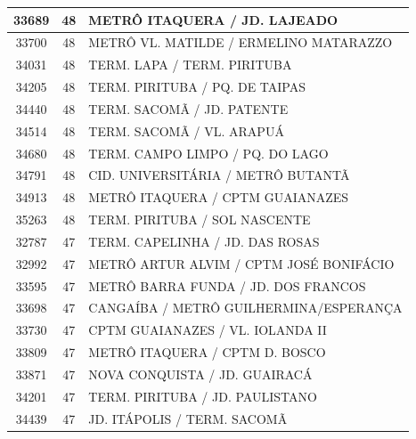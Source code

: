 \documentclass[
	12pt,				%
	oneside,			%
	a4paper,			%
	english,			%
	brazil				%
	]{abntex2ppgsi}
\begin{document}
\begin{apendicesenv}
\begin{longtable}{c|c|p{7cm}}
    33689 & 48    & METRÔ ITAQUERA / JD. LAJEADO \\
\hline

    33700 & 48    & METRÔ VL. MATILDE / ERMELINO MATARAZZO \\
\hline

    34031 & 48    & TERM. LAPA / TERM. PIRITUBA \\
\hline

    34205 & 48    & TERM. PIRITUBA / PQ. DE TAIPAS \\
\hline

    34440 & 48    & TERM. SACOMÃ / JD. PATENTE \\
\hline

    34514 & 48    & TERM. SACOMÃ / VL. ARAPUÁ \\
\hline

    34680 & 48    & TERM. CAMPO LIMPO / PQ. DO LAGO \\
\hline

    34791 & 48    & CID. UNIVERSITÁRIA / METRÔ BUTANTÃ \\
\hline

    34913 & 48    & METRÔ ITAQUERA / CPTM GUAIANAZES \\
\hline

    35263 & 48    & TERM. PIRITUBA / SOL NASCENTE \\
\hline

    32787 & 47    & TERM. CAPELINHA / JD. DAS ROSAS \\
\hline

    32992 & 47    & METRÔ ARTUR ALVIM / CPTM JOSÉ BONIFÁCIO \\
\hline

    33595 & 47    & METRÔ BARRA FUNDA / JD. DOS FRANCOS \\
\hline

    33698 & 47    & CANGAÍBA / METRÔ GUILHERMINA/ESPERANÇA \\
\hline

    33730 & 47    & CPTM GUAIANAZES / VL. IOLANDA II \\
\hline

    33809 & 47    & METRÔ ITAQUERA / CPTM D. BOSCO \\
\hline

    33871 & 47    & NOVA CONQUISTA / JD. GUAIRACÁ \\
\hline

    34201 & 47    & TERM. PIRITUBA / JD. PAULISTANO \\
\hline

    34439 & 47    & JD. ITÁPOLIS / TERM. SACOMÃ \\
\hline


\end{longtable}
\end{apendicesenv}
\end{document}

